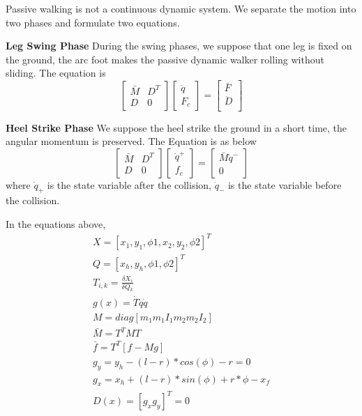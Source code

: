 Passive walking is not a continuous dynamic system. 
We separate the motion into two phases and formulate two equations.

\textbf{Leg Swing Phase}
During the swing phases, we suppose that one leg is fixed on the ground, the arc foot makes the passive dynamic walker rolling without sliding.
The equation is \citep{Wisse2005}
\begin{equation}
\left[
\begin{array}{cc}
\bar{M} &D^{T}\\
D&	0 
\end{array}
\right]
\left[
\begin{array}{c}
\ddot{q} \\
F_{c}
\end{array}
\right]
=
\left[
\begin{array}{c}
\bar{F}\\
\ddot{D}\\
\end{array}
\right]
\end{equation}


\textbf{Heel Strike Phase}
We suppose the heel strike the ground in a short time, the angular momentum is preserved.
The Equation \citep{Wisse2005} is as below
\begin{equation}
\left[
\begin{array}{cc}
\bar {M}& D^{T}\\
D	& 0
\end{array}
\right]
\left[
\begin{array}{c}
\dot{q}^{+}\\
f_{c}	
\end{array}
\right]
=
\left[
\begin{array}{c}
\bar{M}\dot{q}^{-}\\
0
\end{array}
\right]
\end{equation}
where $\dot{q}_{+}$ is the state variable after the collision, $\dot{q}_{-}$ is the state variable before the collision.



In the equations above,
\begin{eqnarray}
X=[x_{1},y_{1},\phi{1},x_{2},y_{2},\phi{2}]^{T} \nonumber\\
Q=[x_{h},y_{h},\phi{1},\phi{2}]^{T} \nonumber \\
T_{i,k}=\frac{\delta X_{i}}{ \delta Q_{k}} \nonumber \\
g(x)=\dot{T} \dot{q} \dot{q}	\nonumber \\
M=diag[m_{1} m_{1} I_{1} m_{2} m_{2} I_{2}] \nonumber \\
\bar{M}=T^{T}MT	\nonumber \\
\bar{f}=T^{T}[f-Mg]\nonumber \\
g_{y}=y_{h}-(l-r)*cos(\phi)-r=0 \nonumber \\
g_{x}=x_{h}+(l-r)*sin(\phi)+r*\phi-x_{f}\nonumber \\
D(x)=[g_{x}  g_{y}]^T=0 \nonumber
\end{eqnarray}


